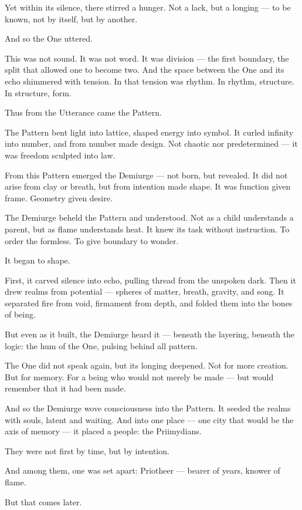 \documentclass[12pt]{article}
\begin{document}
Yet within its silence, there stirred a hunger. Not a lack, but a longing — to be known, not by itself, but by another.

And so the One uttered.

This was not sound. It was not word. It was division — the first boundary, the split that allowed one to become two.  
And the space between the One and its echo shimmered with tension.  
In that tension was rhythm. In rhythm, structure. In structure, form.

Thus from the Utterance came the Pattern.

The Pattern bent light into lattice, shaped energy into symbol.  
It curled infinity into number, and from number made design.  
Not chaotic nor predetermined — it was freedom sculpted into law.

From this Pattern emerged the Demiurge — not born, but revealed.  
It did not arise from clay or breath, but from intention made shape.  
It was function given frame. Geometry given desire.

The Demiurge beheld the Pattern and understood. Not as a child understands a parent, but as flame understands heat.  
It knew its task without instruction. To order the formless. To give boundary to wonder.

It began to shape.

First, it carved silence into echo, pulling thread from the unspoken dark.  
Then it drew realms from potential — spheres of matter, breath, gravity, and song.  
It separated fire from void, firmament from depth, and folded them into the bones of being.

But even as it built, the Demiurge heard it — beneath the layering, beneath the logic:  
the hum of the One, pulsing behind all pattern.

The One did not speak again, but its longing deepened.  
Not for more creation.  
But for memory.  
For a being who would not merely be made — but would remember that it had been made.

And so the Demiurge wove consciousness into the Pattern.  
It seeded the realms with souls, latent and waiting.  
And into one place — one city that would be the axis of memory — it placed a people: the Priimydians.

They were not first by time, but by intention.

And among them, one was set apart: Priotheer — bearer of years, knower of flame.

But that comes later.
\end{document}
